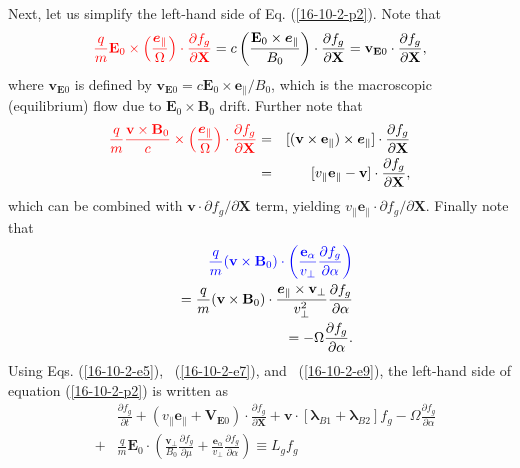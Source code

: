 \documentclass{llncs}
\newcommand{\tmcolor}[2]{{\color{#1}{#2}}}
\newcommand{\tmmathbf}[1]{\ensuremath{\boldsymbol{#1}}}
\begin{document}
Next, let us simplify the left-hand side of Eq. (\ref{16-10-2-p2}). Note that
\begin{equation}
  \label{16-10-2-e5} \tmcolor{red}{\frac{q}{m} \mathbf{E}_0 \times \left(
  \frac{\tmmathbf{e}_{\parallel}}{\Omega}  \right) \cdot \frac{\partial
  f_g}{\partial \mathbf{X}}} = c \left( \frac{\mathbf{E}_0 \times
  \tmmathbf{e}_{\parallel}}{B_0}  \right) \cdot \frac{\partial f_g}{\partial
  \mathbf{X}} =\mathbf{v}_{\mathbf{E}0} \cdot \frac{\partial f_g}{\partial
  \mathbf{X}},
\end{equation}
where $\mathbf{v}_{\mathbf{E}0}$ is defined by $\mathbf{v}_{\mathbf{E}0} =
c\mathbf{E}_0 \times \mathbf{e}_{\parallel} / B_0$, which is the macroscopic
(equilibrium) flow due to $\mathbf{E}_0 \times \mathbf{B}_0$ drift. Further
note that
\begin{eqnarray}
  \tmcolor{red}{\frac{q}{m}  \frac{\mathbf{v} \times \mathbf{B}_0}{c} \times
  \left( \frac{\tmmathbf{e}_{\parallel}}{\Omega}  \right) \cdot \frac{\partial
  f_g}{\partial \mathbf{X}}} & = & [(\mathbf{v} \times \mathbf{e}_{\parallel})
  \times \tmmathbf{e}_{\parallel}] \cdot \frac{\partial f_g}{\partial
  \mathbf{X}} \nonumber\\
  & = & [v_{\parallel} \mathbf{e}_{\parallel} -\mathbf{v}] \cdot
  \frac{\partial f_g}{\partial \mathbf{X}},  \label{16-10-2-e7}
\end{eqnarray}
which can be combined with $\mathbf{v} \cdot \partial f_g / \partial
\mathbf{X}$ term, yielding $v_{\parallel} \mathbf{e}_{\parallel} \cdot
\partial f_g / \partial \mathbf{X}$. Finally note that
\begin{eqnarray}
  &  & \tmcolor{blue}{\frac{q}{m}  (\mathbf{v} \times \mathbf{B}_0) \cdot
  \left( \frac{\mathbf{e}_{\alpha}}{v_{\perp}}  \frac{\partial f_g}{\partial
  \alpha} \right)} \nonumber\\
  &  & = \frac{q}{m}  (\mathbf{v} \times \mathbf{B}_0) \cdot
  \frac{\tmmathbf{e}_{\parallel} \times \mathbf{v}_{\perp}}{v_{\perp}^2} 
  \frac{\partial f_g}{\partial \alpha} \nonumber\\
  &  & = - \Omega \frac{\partial f_g}{\partial \alpha} .  \label{16-10-2-e9}
\end{eqnarray}
Using Eqs. (\ref{16-10-2-e5}), \ (\ref{16-10-2-e7}), and \ (\ref{16-10-2-e9}),
the left-hand side of equation (\ref{16-10-2-p2}) is written as
\begin{eqnarray}
  &  & \frac{\partial f_g}{\partial t} + (v_{\parallel}
  \mathbf{e}_{\parallel} +\mathbf{V}_{\mathbf{E}0}) \cdot \frac{\partial
  f_g}{\partial \mathbf{X}} +\mathbf{v} \cdot [\tmmathbf{\lambda}_{B 1}
  +\tmmathbf{\lambda}_{B 2}] f_g - \Omega \frac{\partial f_g}{\partial \alpha}
  \nonumber\\
  & + & \frac{q}{m} \mathbf{E}_0 \cdot \left( \frac{\mathbf{v}_{\perp}}{B_0} 
  \frac{\partial f_g}{\partial \mu} + \frac{\tmmathbf{e}_{\alpha}}{v_{\perp}} 
  \frac{\partial f_g}{\partial \alpha} \right) \equiv L_g f_g 
  \label{16-9-22-1b}
\end{eqnarray}
\end{document}
